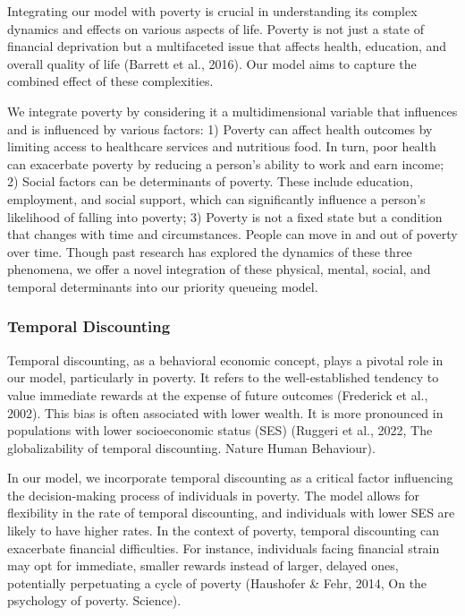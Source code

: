 \documentclass[
]{article}
\begin{document}
Integrating our model with poverty is crucial in understanding its
complex dynamics and effects on various aspects of life. Poverty is not
just a state of financial deprivation but a multifaceted issue that
affects health, education, and overall quality of life (Barrett et al.,
2016). Our model aims to capture the combined effect of these
complexities.

We integrate poverty by considering it a multidimensional variable that
influences and is influenced by various factors: 1) Poverty can affect
health outcomes by limiting access to healthcare services and nutritious
food. In turn, poor health can exacerbate poverty by reducing a person's
ability to work and earn income; 2) Social factors can be determinants
of poverty. These include education, employment, and social support,
which can significantly influence a person's likelihood of falling into
poverty; 3) Poverty is not a fixed state but a condition that changes
with time and circumstances. People can move in and out of poverty over
time. Though past research has explored the dynamics of these three
phenomena, we offer a novel integration of these physical, mental,
social, and temporal determinants into our priority queueing model.

\hypertarget{temporal-discounting}{%
\subsubsection{Temporal Discounting}\label{temporal-discounting}}

Temporal discounting, as a behavioral economic concept, plays a pivotal
role in our model, particularly in poverty. It refers to the
well-established tendency to value immediate rewards at the expense of
future outcomes (Frederick et al., 2002). This bias is often associated
with lower wealth. It is more pronounced in populations with lower
socioeconomic status (SES) (Ruggeri et al., 2022, The globalizability of
temporal discounting. Nature Human Behaviour).

In our model, we incorporate temporal discounting as a critical factor
influencing the decision-making process of individuals in poverty. The
model allows for flexibility in the rate of temporal discounting, and
individuals with lower SES are likely to have higher rates. In the
context of poverty, temporal discounting can exacerbate financial
difficulties. For instance, individuals facing financial strain may opt
for immediate, smaller rewards instead of larger, delayed ones,
potentially perpetuating a cycle of poverty (Haushofer \& Fehr, 2014, On
the psychology of poverty. Science).
\end{document}
